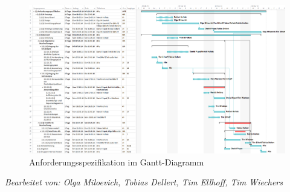 \documentclass[fontsize=12pt,paper=a4,twoside]{scrartcl}
\begin{document}
\newpage
\begin{figure}[!h]
\includegraphics[angle = 90, scale=0.3]{gantt_as.jpg}
\caption{Anforderungsspezifikation im Gantt-Diagramm}
\label{Gantt-AS}
\end{figure}
\newpage


\textit{Bearbeitet von: Olga Miloevich, Tobias Dellert, Tim Ellhoff, Tim Wiechers}\\
\end{document}
